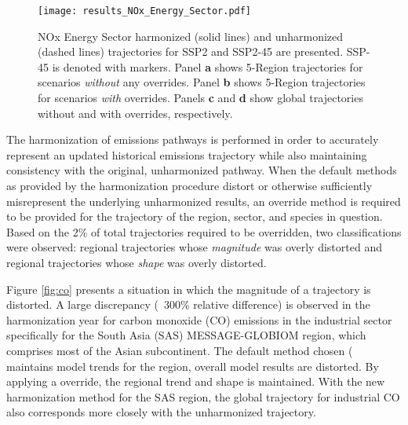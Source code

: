 \begin{figure}
  \begin{center}
    \texttt{[image: results\_NOx\_Energy\_Sector.pdf]}
    \caption[]{
      \label{fig:nox}
      NOx Energy Sector harmonized (solid lines) and unharmonized (dashed lines)
      trajectories for SSP2 and SSP2-45 are presented. SSP-45 is denoted with
      markers. Panel \textbf{a} shows 5-Region trajectories for scenarios
      \textit{without} any overrides. Panel \textbf{b} shows 5-Region
      trajectories for scenarios \textit{with} overrides. Panels \textbf{c} and
      \textbf{d} show global trajectories without and with overrides,
      respectively.  }
  \end{center}
\end{figure}

The harmonization of emissions pathways is performed in order to accurately
represent an updated historical emissions trajectory while also maintaining
consistency with the original, unharmonized pathway. When the default methods as
provided by the harmonization procedure distort or otherwise sufficiently
misrepresent the underlying unharmonized results, an override method is required
to be provided for the trajectory of the region, sector, and species in
question. Based on the 2\% of total trajectories required to be overridden, two
classifications were observed: regional trajectories whose \textit{magnitude}
was overly distorted and regional trajectories whose \textit{shape} was overly
distorted.

Figure \ref{fig:co} presents a situation in which the magnitude of a trajectory
is distorted. A large discrepancy (~300\% relative difference) is observed in
the harmonization year for carbon monoxide (CO) emissions in the industrial
sector specifically for the South Asia (SAS) MESSAGE-GLOBIOM region, which
comprises most of the Asian subcontinent. The default method chosen
( maintains model trends for the region, overall model
results are distorted. By applying a  override, the
regional trend and shape is maintained. With the new harmonization method for
the SAS region, the global trajectory for industrial CO also corresponds more
closely with the unharmonized trajectory.

